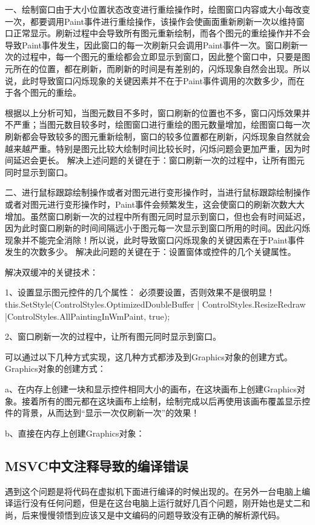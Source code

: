 一、绘制窗口由于大小位置状态改变进行重绘操作时，绘图窗口内容或大小每改变一次，都要调用Paint事件进行重绘操作，该操作会使画面重新刷新一次以维持窗口正常显示。刷新过程中会导致所有图元重新绘制，而各个图元的重绘操作并不会导致Paint事件发生，因此窗口的每一次刷新只会调用Paint事件一次。窗口刷新一次的过程中，每一个图元的重绘都会立即显示到窗口，因此整个窗口中，只要是图元所在的位置，都在刷新，而刷新的时间是有差别的，闪烁现象自然会出现。所以说，此时导致窗口闪烁现象的关键因素并不在于Paint事件调用的次数多少，而在于各个图元的重绘。

根据以上分析可知，当图元数目不多时，窗口刷新的位置也不多，窗口闪烁效果并不严重；当图元数目较多时，绘图窗口进行重绘的图元数量增加，绘图窗口每一次刷新都会导致较多的图元重新绘制，窗口的较多位置都在刷新，闪烁现象自然就会越来越严重。特别是图元比较大绘制时间比较长时，闪烁问题会更加严重，因为时间延迟会更长。
解决上述问题的关键在于：窗口刷新一次的过程中，让所有图元同时显示到窗口。

二、进行鼠标跟踪绘制操作或者对图元进行变形操作时，当进行鼠标跟踪绘制操作或者对图元进行变形操作时，Paint事件会频繁发生，这会使窗口的刷新次数大大增加。虽然窗口刷新一次的过程中所有图元同时显示到窗口，但也会有时间延迟，因为此时窗口刷新的时间间隔远小于图元每一次显示到窗口所用的时间。因此闪烁现象并不能完全消除！所以说，此时导致窗口闪烁现象的关键因素在于Paint事件发生的次数多少。
解决此问题的关键在于：设置窗体或控件的几个关键属性。

解决双缓冲的关键技术：

1、设置显示图元控件的几个属性： 必须要设置，否则效果不是很明显！
this.SetStyle(ControlStyles.OptimizedDoubleBuffer | ControlStyles.ResizeRedraw |ControlStyles.AllPaintingInWmPaint, true);

2、窗口刷新一次的过程中，让所有图元同时显示到窗口。

可以通过以下几种方式实现，这几种方式都涉及到Graphics对象的创建方式。
Graphics对象的创建方式：

a、在内存上创建一块和显示控件相同大小的画布，在这块画布上创建Graphics对象。接着所有的图元都在这块画布上绘制，绘制完成以后再使用该画布覆盖显示控件的背景，从而达到“显示一次仅刷新一次”的效果！

b、直接在内存上创建Graphics对象：

\subsection{MSVC中文注释导致的编译错误}
遇到这个问题是将代码在虚拟机下面进行编译的时候出现的。在另外一台电脑上编译运行没有任何问题，但是在这台电脑上运行就好几百个问题，刚开始也是丈二和尚，后来慢慢领悟到应该又是中文编码的问题导致没有正确的解析源代码。

